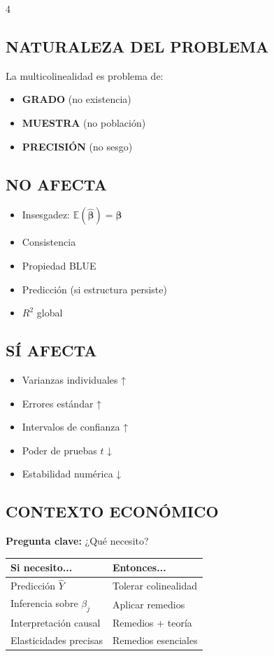 \documentclass[6pt, landscape]{extarticle}
\newcommand{\E}{\mathbb{E}}
\newcommand{\betahat}{\hat{\boldsymbol{\beta}}}
\begin{document}
\begin{multicols*}{4}
\subsection{NATURALEZA DEL PROBLEMA}

\begin{warningbox}
La multicolinealidad es problema de:
\begin{itemize}
    \item \textbf{GRADO} (no existencia)
    \item \textbf{MUESTRA} (no población)
    \item \textbf{PRECISIÓN} (no sesgo)
\end{itemize}
\end{warningbox}

\subsection{NO AFECTA}

\begin{itemize}
    \item Insesgadez: $\E(\betahat) = \boldsymbol{\beta}$
    \item Consistencia
    \item Propiedad BLUE
    \item Predicción (si estructura persiste)
    \item $R^2$ global
\end{itemize}

\subsection{SÍ AFECTA}

\begin{itemize}
    \item Varianzas individuales ↑
    \item Errores estándar ↑
    \item Intervalos de confianza ↑
    \item Poder de pruebas $t$ ↓
    \item Estabilidad numérica ↓
\end{itemize}

\subsection{CONTEXTO ECONÓMICO}

\textbf{Pregunta clave:} ¿Qué necesito?

\begin{center}
{\scriptsize
\begin{tabular}{@{}ll@{}}
\toprule
\textbf{Si necesito...} & \textbf{Entonces...} \\
\midrule
Predicción $\hat{Y}$ & Tolerar colinealidad \\
Inferencia sobre $\beta_j$ & Aplicar remedios \\
Interpretación causal & Remedios + teoría \\
Elasticidades precisas & Remedios esenciales \\
\bottomrule
\end{tabular}
}
\end{center}


\end{multicols*}
\end{document}
